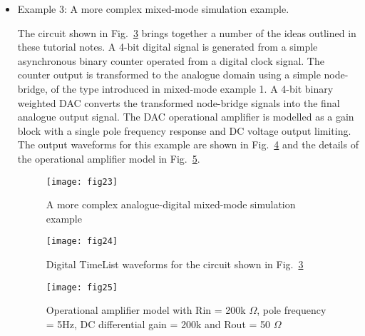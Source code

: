 \begin{itemize}
\begin{figure}[ht]
  \centering
	\texttt{[image: fig21]}
        \caption{Pulse driven digital inverter with active node-bridge}
        \label{fig:fig21}
\end{figure} 

\begin{figure}[ht]
  \centering
	\texttt{[image: fig22]}
        \caption{Digital TimeList waveforms for the circuit shown in Fig.~\ref{fig:fig21}}
        \label{fig:fig22}
\end{figure} 
\FloatBarrier

\item Example 3: A more complex mixed-mode simulation example.

The circuit shown in Fig.~\ref{fig:fig23} brings together a number of
the ideas outlined in these tutorial notes.  A 4-bit digital signal is
generated from a simple asynchronous binary counter operated from a
digital clock signal.  The counter output is transformed to the
analogue domain using a simple node-bridge, of the type introduced in
mixed-mode example 1.  A 4-bit binary weighted DAC converts the
transformed node-bridge signals into the final analogue output signal.
The DAC operational amplifier is modelled as a gain block with a
single pole frequency response and DC voltage output limiting.  The
output waveforms for this example are shown in Fig.~\ref{fig:fig24}
and the details of the operational amplifier model in
Fig.~\ref{fig:fig25}.
\begin{figure}[ht]
  \centering
	\texttt{[image: fig23]}
        \caption{A more complex analogue-digital mixed-mode simulation example}
        \label{fig:fig23}
\end{figure}
\begin{figure}[ht]
  \centering
	\texttt{[image: fig24]}
        \caption{Digital TimeList waveforms for the circuit shown in Fig.~\ref{fig:fig23}}
        \label{fig:fig24}
\end{figure}
\begin{figure}[ht]
  \centering
	\texttt{[image: fig25]}
\caption{Operational amplifier model with Rin = 200k $\Omega$, pole frequency = 5Hz, DC differential gain = 200k and Rout = 50 $\Omega$}
        \label{fig:fig25}
\end{figure}
\end{itemize}

